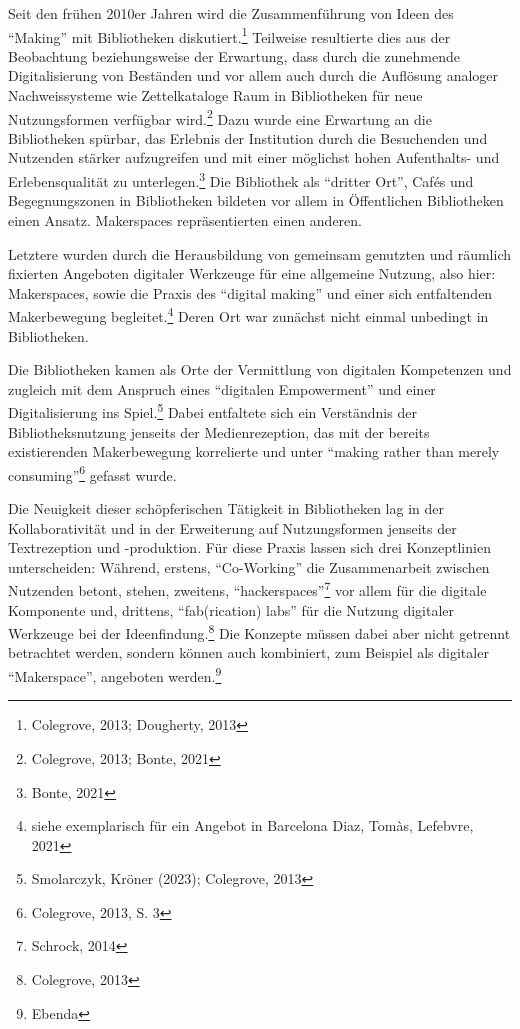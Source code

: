 \documentclass[a4paper,
fontsize=11pt,
oneside,
numbers=noperiodatend,
parskip=half-,
bibliography=totoc,
final
]{scrartcl}
\begin{document}
Seit den frühen 2010er Jahren wird die Zusammenführung von Ideen des
\enquote{Making} mit Bibliotheken diskutiert.\footnote{Colegrove, 2013;
  Dougherty, 2013} Teilweise resultierte dies aus der Beobachtung
beziehungsweise der Erwartung, dass durch die zunehmende Digitalisierung
von Beständen und vor allem auch durch die Auflösung analoger
Nachweissysteme wie Zettelkataloge Raum in Bibliotheken für neue
Nutzungsformen verfügbar wird.\footnote{Colegrove, 2013; Bonte, 2021}
Dazu wurde eine Erwartung an die Bibliotheken spürbar, das Erlebnis der
Institution durch die Besuchenden und Nutzenden stärker aufzugreifen und
mit einer möglichst hohen Aufenthalts- und Erlebensqualität zu
unterlegen.\footnote{Bonte, 2021} Die Bibliothek als \enquote{dritter
Ort}, Cafés und Begegnungszonen in Bibliotheken bildeten vor allem in
Öffentlichen Bibliotheken einen Ansatz. Makerspaces repräsentierten
einen anderen.

Letztere wurden durch die Herausbildung von gemeinsam genutzten und
räumlich fixierten Angeboten digitaler Werkzeuge für eine allgemeine
Nutzung, also hier: Makerspaces, sowie die Praxis des \enquote{digital
making} und einer sich entfaltenden Makerbewegung begleitet.\footnote{siehe
  exemplarisch für ein Angebot in Barcelona Diaz, Tomàs, Lefebvre, 2021}
Deren Ort war zunächst nicht einmal unbedingt in Bibliotheken.

Die Bibliotheken kamen als Orte der Vermittlung von digitalen
Kompetenzen und zugleich mit dem Anspruch eines \enquote{digitalen
Empowerment} und einer Digitalisierung ins Spiel.\footnote{Smolarczyk,
  Kröner (2023); Colegrove, 2013} Dabei entfaltete sich ein Verständnis
der Bibliotheksnutzung jenseits der Medienrezeption, das mit der bereits
existierenden Makerbewegung korrelierte und unter \enquote{making rather
than merely consuming}\footnote{Colegrove, 2013, S. 3} gefasst wurde.

Die Neuigkeit dieser schöpferischen Tätigkeit in Bibliotheken lag in der
Kollaborativität und in der Erweiterung auf Nutzungsformen jenseits der
Textrezeption und -produktion. Für diese Praxis lassen sich drei
Konzeptlinien unterscheiden: Während, erstens, \enquote{Co-Working} die
Zusammenarbeit zwischen Nutzenden betont, stehen, zweitens,
\enquote{hackerspaces}\footnote{Schrock, 2014} vor allem für die
digitale Komponente und, drittens, \enquote{fab(rication) labs} für die
Nutzung digitaler Werkzeuge bei der Ideenfindung.\footnote{Colegrove,
  2013} Die Konzepte müssen dabei aber nicht getrennt betrachtet werden,
sondern können auch kombiniert, zum Beispiel als digitaler
\enquote{Makerspace}, angeboten werden.\footnote{Ebenda}
\end{document}

